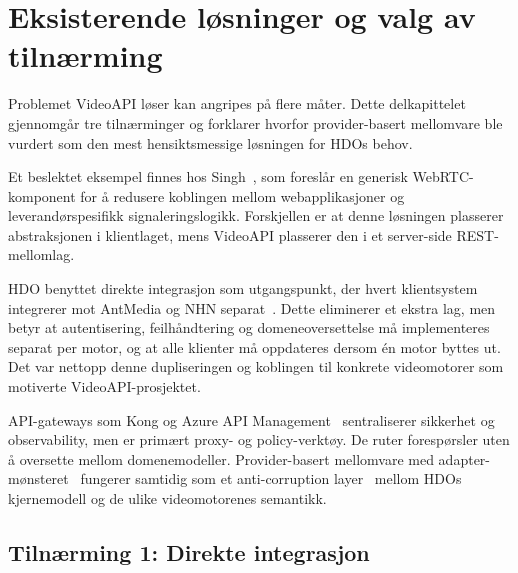 \section{Eksisterende løsninger og valg av tilnærming}
\label{sec:eksisterende-loesninger}

Problemet VideoAPI løser kan angripes på flere måter. Dette delkapittelet
gjennomgår tre tilnærminger og forklarer hvorfor provider-basert
mellomvare ble vurdert som den mest hensiktsmessige løsningen for
HDOs behov.

Et beslektet eksempel finnes hos Singh~\cite{singh2026video}, som
foreslår en generisk WebRTC-komponent for å redusere koblingen mellom
webapplikasjoner og leverandørspesifikk signaleringslogikk. Forskjellen
er at denne løsningen plasserer abstraksjonen i klientlaget, mens
VideoAPI plasserer den i et server-side REST-mellomlag.

HDO benyttet direkte integrasjon som utgangspunkt, der hvert
klientsystem integrerer mot AntMedia og NHN separat~\cite{hdo_oppgave}.
Dette eliminerer et ekstra lag, men betyr at autentisering,
feilhåndtering og domeneoversettelse må implementeres separat per
motor, og at alle klienter må oppdateres dersom én motor byttes ut.
Det var nettopp denne dupliseringen og koblingen til konkrete
videomotorer som motiverte VideoAPI-prosjektet.

API-gateways som Kong og Azure API
Management~\cite{microsoft-api-gateway} sentraliserer sikkerhet og
observability, men er primært proxy- og policy-verktøy. De ruter
forespørsler uten å oversette mellom domenemodeller. Provider-basert
mellomvare med adapter-mønsteret~\cite{cockburn-hexagonal,
microsoft-clean-architecture} fungerer samtidig som et
anti-corruption layer~\cite{microsoft-acl} mellom HDOs kjernemodell
og de ulike videomotorenes semantikk.

\subsection*{Tilnærming 1: Direkte integrasjon}

